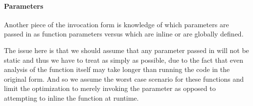 \paragraph{Parameters}
Another piece of the invocation form is knowledge of which parameters are passed in as function parameters versus which are inline or are globally defined.

The issue here is that we should assume that any parameter passed in will not be static and thus we have to treat as simply as possible, due to the fact that even analysis of the function itself may take longer than running the code in the original form.  And so we assume the worst case scenario for these functions and limit the optimization to merely invoking the parameter as opposed to attempting to inline the function at runtime.